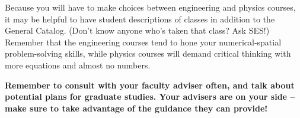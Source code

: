 Because you will have to make choices between engineering and physics courses, it may be helpful to have student descriptions of classes in addition to the General Catalog. (Don’t know anyone who’s taken that class? Ask SES!) Remember that the engineering courses tend to hone your numerical-spatial problem-solving skills, while physics courses will demand critical thinking with more equations and almost no numbers.

\textbf{Remember to consult with your faculty adviser often, and talk about potential plans for graduate studies. Your advisers are on your side – make sure to take advantage of the guidance they can provide!}

